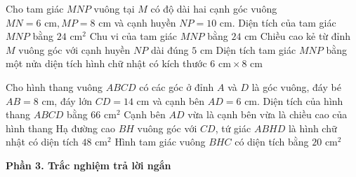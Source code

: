 \begin{ex} %
Cho tam giác $MNP$ vuông tại $M$ có độ dài hai cạnh góc vuông $MN = 6\text{ cm}, MP = 8\text{ cm}$ và cạnh huyền $NP = 10\text{ cm}$.
\choiceTF
{\True Diện tích của tam giác $MNP$ bằng $24\text{ cm}^2$}
{\True Chu vi của tam giác $MNP$ bằng $24\text{ cm}$}
{Chiều cao kẻ từ đỉnh $M$ vuông góc với cạnh huyền $NP$ dài đúng $5\text{ cm}$}
{\True Diện tích tam giác $MNP$ bằng một nửa diện tích hình chữ nhật có kích thước $6\text{ cm} \times 8\text{ cm}$}
\end{ex}

\begin{ex} %
Cho hình thang vuông $ABCD$ có các góc ở đỉnh $A$ và $D$ là góc vuông, đáy bé $AB = 8\text{ cm}$, đáy lớn $CD = 14\text{ cm}$ và cạnh bên $AD = 6\text{ cm}$.
\choiceTF
{\True Diện tích của hình thang $ABCD$ bằng $66\text{ cm}^2$}
{\True Cạnh bên $AD$ vừa là cạnh bên vừa là chiều cao của hình thang}
{\True Hạ đường cao $BH$ vuông góc với $CD$, tứ giác $ABHD$ là hình chữ nhật có diện tích $48\text{ cm}^2$}
{Hình tam giác vuông $BHC$ có diện tích bằng $20\text{ cm}^2$}
\end{ex}

\textbf{Phần 3. Trắc nghiệm trả lời ngắn}

